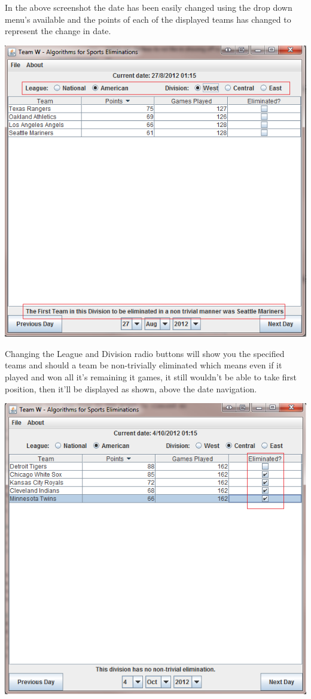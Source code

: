 In the above screenshot the date has been easily changed using the drop down
menu's available and the points of each of the displayed teams has changed to
represent the change in date.

\includegraphics[width=\linewidth,keepaspectratio]{images/userManualDesk3.png}

Changing the League and Division radio buttons will show you the specified teams
and should a team be non-trivially eliminated which means even if it played and
won all it's remaining it games, it still wouldn't be able to take first
position, then it'll be displayed as shown, above the date navigation.

\includegraphics[width=\linewidth,keepaspectratio]{images/userManualDesk4.png}

